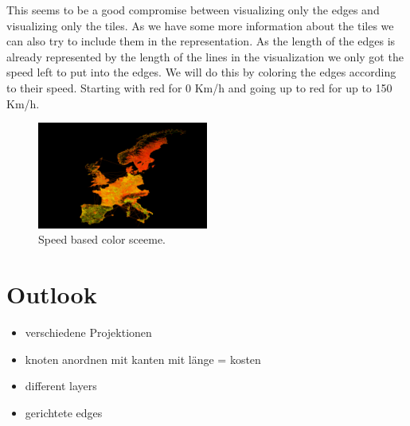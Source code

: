 \documentclass
[
	paper = a4,
    pagesize,
	12 pt,
	oneside,                       %
    open = right,
	DIV = calc,
	BCOR = 0 mm,                   %
	bibtotoc
]
{scrbook}
\begin{document}
This seems to be a good compromise between visualizing only the edges and visualizing only the tiles.
As we have some more information about the tiles we can also try to include them in the representation.
As the length of the edges is already represented by the length of the lines in the visualization we only got the speed left to put into the edges.
We will do this by coloring the edges according to their speed.
Starting with red for 0 Km/h and going up to red for up to 150 Km/h.

\begin{figure}[H]
	\includegraphics[width=0.5\textwidth]{Images/placeholder.png}
\caption[]{Speed based color sceeme.}
\label{fig:splitted tiles}
\end{figure}



\chapter{Outlook}
\begin{itemize}
	\item verschiedene Projektionen
	\item knoten anordnen mit kanten mit länge = kosten
	\item different layers
	\item gerichtete edges
\end{itemize}
\end{document}
